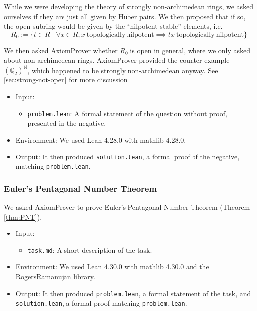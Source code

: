 \documentclass[12pt]{amsart}
\theoremstyle{definition}
\theoremstyle{remark}
\numberwithin{equation}{subsection}
\newcommand{\N}{\mathbb N}
\newcommand{\Q}{\mathbb Q}
\begin{document}
While we were developing the theory of strongly non-archimedean rings, we asked ourselves if they are just all given by Huber pairs. We then proposed that if so, the open subring would be given by the ``nilpotent-stable'' elements, i.e.
\begin{equation}
R_0 := \{t \in R \mid \forall x \in R, x~\mathrm{topologically~nilpotent} \implies tx~\mathrm{topologically~nilpotent}\}
\end{equation}

We then asked AxiomProver whether $R_0$ is open in general, where we only asked about non-archimedean rings. AxiomProver provided the counter-example $(\Q_2)^\N$, which happened to be strongly non-archimedean anyway. See \ref{sec:strong-not-open} for more discussion.

\begin{itemize}
\item Input:
\begin{itemize}
\item \texttt{problem.lean}: A formal statement of the question without proof, presented in the negative.
\end{itemize}
\item Environment: We used Lean 4.28.0 with mathlib 4.28.0.
\item Output: It then produced \texttt{solution.lean}, a formal proof of the negative, matching \texttt{problem.lean}.
\end{itemize}

\subsubsection{Euler's Pentagonal Number Theorem}

We asked AxiomProver to prove Euler's Pentagonal Number Theorem (Theorem \ref{thm:PNT}).

\begin{itemize}
\item Input:
\begin{itemize}
\item \texttt{task.md}: A short description of the task.
\end{itemize}
\item Environment: We used Lean 4.30.0 with mathlib 4.30.0 and the RogersRamanujan library.
\item Output: It then produced \texttt{problem.lean}, a formal statement of the task, and \texttt{solution.lean}, a formal proof matching \texttt{problem.lean}.
\end{itemize}
\end{document}

